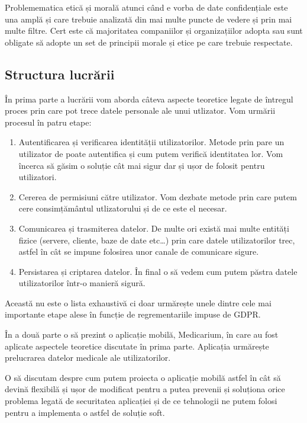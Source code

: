 \documentclass[12pt]{article}
\begin{document}
Problemematica etică și morală atunci când e vorba de date confidențiale este una amplă
și care trebuie analizată din mai multe puncte de vedere și prin mai multe filtre.
 Cert este că majoritatea companiilor
și organizațiilor adopta sau sunt obligate să adopte un set de principii morale
și etice pe care trebuie respectate.


\newpage
\subsection{Structura lucrării}

În prima parte a lucrării vom aborda câteva aspecte teoretice legate de întregul proces
prin care pot trece datele personale ale unui utlizator.
Vom urmării procesul în patru etape:

\begin{enumerate}
    \item Autentificarea și verificarea identității utilizatorilor. Metode prin pare un utilizator 
    de poate autentifica și cum putem verifică
    identitatea lor. Vom încerca să găsim o soluție cât mai sigur dar și ușor de
    folosit pentru utilizatori.
    \item Cererea de permisiuni către utilizator. Vom dezbate metode prin
    care putem cere consimțământul utlizatorului și de ce este el necesar.
    \item Comunicarea și trasmiterea datelor. De multe ori există mai multe entități fizice 
    (servere, cliente, baze de date etc\dots) prin care datele utilizatorilor trec, 
    astfel în cât se impune folosirea unor canale de comunicare sigure.
    \item Persistarea și criptarea datelor. În final o să vedem cum putem păstra
    datele utilizatorilor într-o manieră sigură.  
\end{enumerate}

Această nu este o lista exhaustivă ci doar urmărește unele dintre cele mai importante 
etape alese în funcție de regrementariile impuse de GDPR. 

\bigskip

În a două parte o să prezint o aplicație mobilă, Medicarium, în care au fost aplicate
aspectele teoretice discutate în prima parte. Aplicația urmărește prelucrarea datelor
medicale ale utilizatorilor. 

O să discutam despre cum putem proiecta o aplicație mobilă astfel în cât
să devină flexibilă și ușor de modificat pentru a putea prevenii și soluționa orice
problema legată de securitatea aplicației și de ce tehnologii ne putem 
folosi pentru a implementa o astfel de soluție soft.
\end{document}
